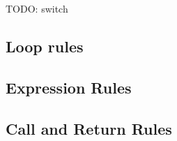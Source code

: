 \documentclass[acmsmall,review,anonymous]{acmart}\settopmatter{printfolios=true,printccs=false,printacmref=false}
\begin{document}
TODO: switch

\subsection{Loop rules}

\whilestep
\whiletruestep
\whilefalsestep
\whileskipcontinuestep
\whilebreakstep

\dowhilestep
\dowhileskipcontinuestep
\dowhilefalsestep
\dowhiletruestep
\dowhilebreakstep

\forinitstep
\forstep
\forfalsestep
\fortruestep
\forskiporcontinuestep
\forbreakstep
\forskippoststep

\subsection{Expression Rules}

\allocstep
\valofstep
\assignopstep
\postincstep
\assignstep
\varstep
\unopstep
\binopstep
\callexprstep

\subsection{Call and Return Rules}

\callstep
\returnstep
\end{document}
